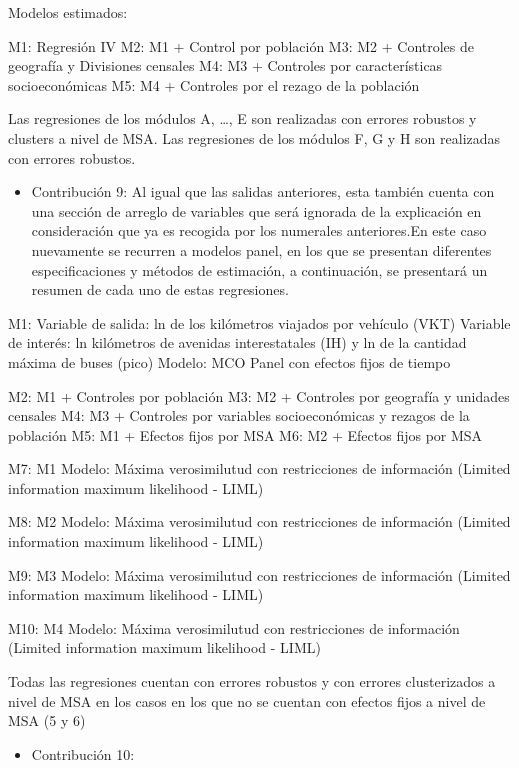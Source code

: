 \documentclass[
]{article}
\providecommand{\tightlist}{%
  \setlength{\itemsep}{0pt}\setlength{\parskip}{0pt}}
\begin{document}
Modelos estimados:

M1: Regresión IV M2: M1 + Control por población M3: M2 + Controles de
geografía y Divisiones censales M4: M3 + Controles por características
socioeconómicas M5: M4 + Controles por el rezago de la población

Las regresiones de los módulos A, \ldots, E son realizadas con errores
robustos y clusters a nivel de MSA. Las regresiones de los módulos F, G
y H son realizadas con errores robustos.

\begin{itemize}
\tightlist
\item
  Contribución 9: Al igual que las salidas anteriores, esta también
  cuenta con una sección de arreglo de variables que será ignorada de la
  explicación en consideración que ya es recogida por los numerales
  anteriores.En este caso nuevamente se recurren a modelos panel, en los
  que se presentan diferentes especificaciones y métodos de estimación,
  a continuación, se presentará un resumen de cada uno de estas
  regresiones.
\end{itemize}

M1: Variable de salida: ln de los kilómetros viajados por vehículo (VKT)
Variable de interés: ln kilómetros de avenidas interestatales (IH) y ln
de la cantidad máxima de buses (pico) Modelo: MCO Panel con efectos
fijos de tiempo

M2: M1 + Controles por población M3: M2 + Controles por geografía y
unidades censales M4: M3 + Controles por variables socioeconómicas y
rezagos de la población M5: M1 + Efectos fijos por MSA M6: M2 + Efectos
fijos por MSA

M7: M1 Modelo: Máxima verosimilutud con restricciones de información
(Limited information maximum likelihood - LIML)

M8: M2 Modelo: Máxima verosimilutud con restricciones de información
(Limited information maximum likelihood - LIML)

M9: M3 Modelo: Máxima verosimilutud con restricciones de información
(Limited information maximum likelihood - LIML)

M10: M4 Modelo: Máxima verosimilutud con restricciones de información
(Limited information maximum likelihood - LIML)

Todas las regresiones cuentan con errores robustos y con errores
clusterizados a nivel de MSA en los casos en los que no se cuentan con
efectos fijos a nivel de MSA (5 y 6)

\begin{itemize}
\tightlist
\item
  Contribución 10:
\end{itemize}
\end{document}
